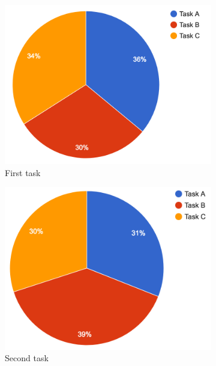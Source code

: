 \begin{figure}[H]
	\centering
	\begin{subfigure}[b]{0.32\textwidth}
		\centering
		\includegraphics[width=\linewidth]{fig/firsttask}
		\caption{First task}
		\label{fig:firsttask}
	\end{subfigure}
	\begin{subfigure}[b]{0.32\textwidth}
		\centering
		\includegraphics[width=\linewidth]{fig/secondtask}
		\caption{Second task}
		\label{fig:secondtask}
	\end{subfigure}
	\begin{subfigure}[b]{0.32\textwidth}
		\centering

\end{subfigure}
\end{figure}
